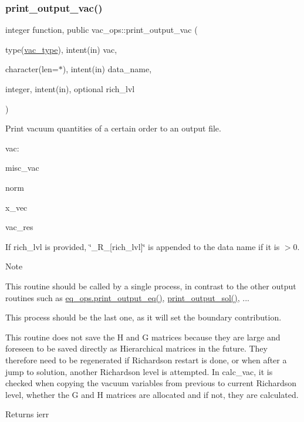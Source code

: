 \subsubsection{\texorpdfstring{print\+\_\+output\+\_\+vac()}{print\_output\_vac()}}
{\footnotesize\ttfamily integer function, public vac\+\_\+ops\+::print\+\_\+output\+\_\+vac (\begin{DoxyParamCaption}\item[{type(\hyperlink{structvac__vars_1_1vac__type}{vac\+\_\+type}), intent(in)}]{vac,  }\item[{character(len=$\ast$), intent(in)}]{data\+\_\+name,  }\item[{integer, intent(in), optional}]{rich\+\_\+lvl }\end{DoxyParamCaption})}



Print vacuum quantities of a certain order to an output file. 


\begin{DoxyItemize}
\item vac\+:
\begin{DoxyItemize}
\item {\ttfamily misc\+\_\+vac} 
\item {\ttfamily norm} 
\item {\ttfamily x\+\_\+vec} 
\item {\ttfamily vac\+\_\+res} 
\end{DoxyItemize}
\end{DoxyItemize}

If {\ttfamily rich\+\_\+lvl} is provided, {\ttfamily \char`\"{}\+\_\+\+R\+\_\+\mbox{[}rich\+\_\+lvl\mbox{]}\char`\"{}} is appended to the data name if it is {\ttfamily $>$0}.

\begin{DoxyNote}{Note}

\begin{DoxyEnumerate}
\item This routine should be called by a single process, in contrast to the other output routines such as \hyperlink{interfaceeq__ops_1_1print__output__eq}{eq\+\_\+ops.\+print\+\_\+output\+\_\+eq()}, \hyperlink{namespacesol__ops_a06eb95d55da45ff2a1f830a380e0cf80}{print\+\_\+output\+\_\+sol()}, ...
\item This process should be the last one, as it will set the boundary contribution.
\item This routine does not save the {\ttfamily H} and {\ttfamily G} matrices because they are large and foreseen to be saved directly as Hierarchical matrices in the future. They therefore need to be regenerated if Richardson restart is done, or when after a jump to solution, another Richardson level is attempted. In calc\+\_\+vac, it is checked when copying the vacuum variables from previous to current Richardson level, whether the {\ttfamily G} and {\ttfamily H} matrices are allocated and if not, they are calculated.
\end{DoxyEnumerate}
\end{DoxyNote}
\begin{DoxyReturn}{Returns}
ierr
\end{DoxyReturn}

